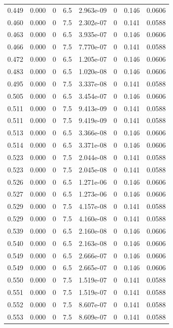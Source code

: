\documentclass[preview]{standalone}
\begin{document}
{{{\begin{tabular}{L{1.2cm}C{1.2cm} C{0.3cm}C{0.5cm} C{1.4cm}C{1.4cm} C{1.4cm}C{1.4cm}}
  0.449  &  0.000  & 0     & 6.5 &  2.963e-09  & 0  & 0.146 &  0.0606   \\ 
  0.460  &  0.000  & 0     & 7.5 &  2.302e-07  & 0  & 0.141 &  0.0588   \\ 
  0.463  &  0.000  & 0     & 6.5 &  3.935e-07  & 0  & 0.146 &  0.0606   \\ 
  0.466  &  0.000  & 0     & 7.5 &  7.770e-07  & 0  & 0.141 &  0.0588   \\ 
  0.472  &  0.000  & 0     & 6.5 &  1.205e-07  & 0  & 0.146 &  0.0606   \\ 
  0.483  &  0.000  & 0     & 6.5 &  1.020e-08  & 0  & 0.146 &  0.0606   \\ 
  0.495  &  0.000  & 0     & 7.5 &  3.337e-08  & 0  & 0.141 &  0.0588   \\ 
  0.505  &  0.000  & 0     & 6.5 &  3.454e-07  & 0  & 0.146 &  0.0606   \\ 
  0.511  &  0.000  & 0     & 7.5 &  9.413e-09  & 0  & 0.141 &  0.0588   \\ 
  0.511  &  0.000  & 0     & 7.5 &  9.419e-09  & 0  & 0.141 &  0.0588   \\ 
  0.513  &  0.000  & 0     & 6.5 &  3.366e-08  & 0  & 0.146 &  0.0606   \\ 
  0.514  &  0.000  & 0     & 6.5 &  3.371e-08  & 0  & 0.146 &  0.0606   \\ 
  0.523  &  0.000  & 0     & 7.5 &  2.044e-08  & 0  & 0.141 &  0.0588   \\ 
  0.523  &  0.000  & 0     & 7.5 &  2.045e-08  & 0  & 0.141 &  0.0588   \\ 
  0.526  &  0.000  & 0     & 6.5 &  1.271e-06  & 0  & 0.146 &  0.0606   \\ 
  0.527  &  0.000  & 0     & 6.5 &  1.273e-06  & 0  & 0.146 &  0.0606   \\ 
  0.529  &  0.000  & 0     & 7.5 &  4.157e-08  & 0  & 0.141 &  0.0588   \\ 
  0.529  &  0.000  & 0     & 7.5 &  4.160e-08  & 0  & 0.141 &  0.0588   \\ 
  0.539  &  0.000  & 0     & 6.5 &  2.160e-08  & 0  & 0.146 &  0.0606   \\ 
  0.540  &  0.000  & 0     & 6.5 &  2.163e-08  & 0  & 0.146 &  0.0606   \\ 
  0.549  &  0.000  & 0     & 6.5 &  2.666e-07  & 0  & 0.146 &  0.0606   \\ 
  0.549  &  0.000  & 0     & 6.5 &  2.665e-07  & 0  & 0.146 &  0.0606   \\ 
  0.550  &  0.000  & 0     & 7.5 &  1.519e-07  & 0  & 0.141 &  0.0588   \\ 
  0.551  &  0.000  & 0     & 7.5 &  1.519e-07  & 0  & 0.141 &  0.0588   \\ 
  0.552  &  0.000  & 0     & 7.5 &  8.607e-07  & 0  & 0.141 &  0.0588   \\ 
  0.553  &  0.000  & 0     & 7.5 &  8.609e-07  & 0  & 0.141 &  0.0588   \\ 
\hline 
\end{tabular} 

}}}
\end{document}

